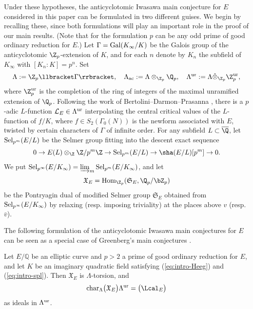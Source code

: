 Under these hypotheses, the anticyclotomic Iwasawa main conjecture for $E$ {considered in this paper}
can be formulated in two different guises. We begin by recalling these, since both formulations will play an important role in the proof of our main results. (Note that for the formulation $p$ can be any odd prime of good ordinary reduction for $E$.) Let $\Gamma={\rm Gal}(K_\infty/K)$ be the Galois group of the anticyclotomic $\Z_p$-extension of $K$, and for each $n$ denote by $K_n$ the subfield of $K_\infty$ with $[K_n:K]=p^n$. Set
\[
\Lambda:=\Z_p\llbracket\Gamma\rrbracket,\quad\Lambda_{\rm ac}:=\Lambda\otimes_{\Z_p}\Q_p,\quad\Lambda^{\rm ur}:=\Lambda\hat\otimes_{\Z_p}\Z_p^{\rm ur},
\]
where $\Z_p^{\rm ur}$ is the completion of the ring of integers of the maximal unramified extension of $\Q_p$.
Following the work of Bertolini--Darmon--Prasanna \cite{BDP}, there is a $p$-adic $L$-function $\mathcal{L}_E\in\Lambda^{\rm ur}$ interpolating the central critical values of {the $L$-function of}
 $f/K$, where $f\in S_2(\Gamma_0(N))$ is the newform associated with $E$, twisted by certain characters of $\Gamma$
of infinite order. For any subfield $L\subset\overline{\Q}$, let ${\rm Sel}_{p^m}(E/L)$ be the Selmer group fitting into the descent exact sequence
\[
0\rightarrow E(L)\otimes_{\Z}\Z/p^m\Z\rightarrow{\rm Sel}_{p^m}(E/L)\rightarrow\sha(E/L)[p^m]\rightarrow 0.
\]
We put ${\rm Sel}_{p^\infty}(E/K_\infty)=\varinjlim_m{\rm Sel}_{p^m}(E/K_\infty)$, %
and let
\[
\mathfrak{X}_E={\rm Hom}_{\Z_p}(\mathfrak{S}_E,\Q_p/\bZ_p)
\]
be the Pontryagin dual of {modified} Selmer group $\mathfrak{S}_E$ obtained from ${\rm Sel}_{p^\infty}(E/K_\infty)$
by relaxing (resp. imposing triviality) at the places above $v$ (resp. $\bar{v}$).


The following formulation of the anticyclotomic Iwasawa main conjectures for $E$ can be seen as a special case of Greenberg's main conjectures \cite{greenberg-motives}.

\begin{conj}
\notready\label{conj:BDP}
Let $E/\mathbb{Q}$ be an elliptic curve and $p>2$ a prime of good ordinary reduction for $E$, and let $K$ be an imaginary quadratic field satisfying {\rm (\ref{eq:intro-Heeg})} and  {\rm (\ref{eq:intro-spl})}. %
Then $\mathfrak{X}_E$ is $\Lambda$-torsion, and
\[
{\rm char}_\Lambda\bigl(\mathfrak{X}_E\bigr)\Lambda^{\rm ur}=\bigl(\Lcal_E\bigr)
\]
as ideals in $\Lambda^{\rm ur}$.
\end{conj}

